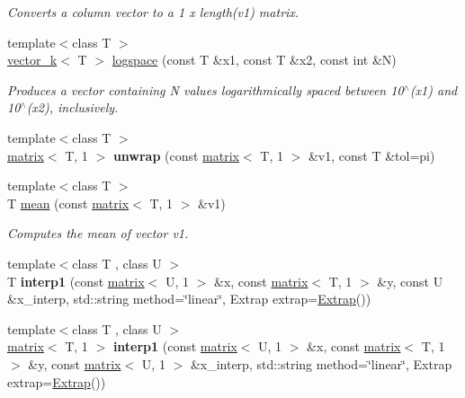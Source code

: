 \begin{DoxyCompactItemize}
\begin{DoxyCompactList}\small\item\em Converts a column vector to a 1 x length(v1) matrix. \end{DoxyCompactList}\item 
{\footnotesize template$<$class T $>$ }\\\hyperlink{classkeycpp_1_1vector__k}{vector\-\_\-k}$<$ T $>$ \hyperlink{namespacekeycpp_a9e1c37fd71074c56e963be121e5de0f3}{logspace} (const T \&x1, const T \&x2, const int \&N)
\begin{DoxyCompactList}\small\item\em Produces a vector containing N values logarithmically spaced between 10$^\wedge$(x1) and 10$^\wedge$(x2), inclusively. \end{DoxyCompactList}\item 
\hypertarget{namespacekeycpp_ae471c1edede10cab9baaa3f97b79f9fe}{{\footnotesize template$<$class T $>$ }\\\hyperlink{classkeycpp_1_1matrix}{matrix}$<$ T, 1 $>$ {\bfseries unwrap} (const \hyperlink{classkeycpp_1_1matrix}{matrix}$<$ T, 1 $>$ \&v1, const T \&tol=pi)}\label{namespacekeycpp_ae471c1edede10cab9baaa3f97b79f9fe}

\item 
\hypertarget{namespacekeycpp_af61f867ee04a259b9690cf4fd793ca35}{{\footnotesize template$<$class T $>$ }\\T \hyperlink{namespacekeycpp_af61f867ee04a259b9690cf4fd793ca35}{mean} (const \hyperlink{classkeycpp_1_1matrix}{matrix}$<$ T, 1 $>$ \&v1)}\label{namespacekeycpp_af61f867ee04a259b9690cf4fd793ca35}

\begin{DoxyCompactList}\small\item\em Computes the mean of vector v1. \end{DoxyCompactList}\item 
\hypertarget{namespacekeycpp_a69cb099fd0d2482617127385c7de7a06}{{\footnotesize template$<$class T , class U $>$ }\\T {\bfseries interp1} (const \hyperlink{classkeycpp_1_1matrix}{matrix}$<$ U, 1 $>$ \&x, const \hyperlink{classkeycpp_1_1matrix}{matrix}$<$ T, 1 $>$ \&y, const U \&x\-\_\-interp, std\-::string method=\char`\"{}linear\char`\"{}, Extrap extrap=\hyperlink{classkeycpp_1_1_extrap}{Extrap}())}\label{namespacekeycpp_a69cb099fd0d2482617127385c7de7a06}

\item 
\hypertarget{namespacekeycpp_a378d96774bbc4017e0bd39ccfed82e5d}{{\footnotesize template$<$class T , class U $>$ }\\\hyperlink{classkeycpp_1_1matrix}{matrix}$<$ T, 1 $>$ {\bfseries interp1} (const \hyperlink{classkeycpp_1_1matrix}{matrix}$<$ U, 1 $>$ \&x, const \hyperlink{classkeycpp_1_1matrix}{matrix}$<$ T, 1 $>$ \&y, const \hyperlink{classkeycpp_1_1matrix}{matrix}$<$ U, 1 $>$ \&x\-\_\-interp, std\-::string method=\char`\"{}linear\char`\"{}, Extrap extrap=\hyperlink{classkeycpp_1_1_extrap}{Extrap}())}\label{namespacekeycpp_a378d96774bbc4017e0bd39ccfed82e5d}


\end{DoxyCompactItemize}
